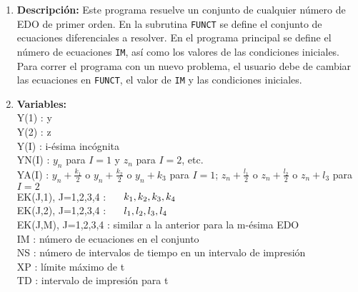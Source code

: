 \documentclass[11pt]{article}
\begin{document}
\begin{enumerate}
\item \textbf{Descripción:} Este programa resuelve un conjunto de cualquier número de EDO de primer orden. En la subrutina \texttt{FUNCT} se define el conjunto de ecuaciones diferenciales a resolver. En el programa principal se define el número de ecuaciones \texttt{IM}, así como los valores de las condiciones iniciales. Para correr el programa con un nuevo problema, el usuario debe de cambiar las ecuaciones en \texttt{FUNCT}, el valor de \texttt{IM} y las condiciones iniciales.
\item \textbf{Variables:}\\
Y(1) : y \\
Y(2) : z \\
Y(I) : i-ésima incógnita \\
YN(I) : $y_{n}$ para $I=1$ y $z_{n}$ para $I=2$, etc. \\
YA(I) : $y_{n}+\frac{k_{1}}{2}$ o $y_{n}+\frac{k_{2}}{2}$ o $y_{n}+k_{3}$ para $I=1$; $z_{n}+\frac{l_{1}}{2}$ o $z_{n}+\frac{l_{2}}{2}$ o $z_{n}+l_{3}$ para $I=2$\\
EK(J,1), J=1,2,3,4 : $\hspace{0.5cm} k_{1},k_{2},k_{3},k_{4}$ \\
EK(J,2), J=1,2,3,4 : $\hspace{0.5cm} l_{1},l_{2},l_{3},l_{4}$ \\
EK(J,M), J=1,2,3,4 : similar a la anterior para la m-ésima EDO \\
IM : número de ecuaciones en el conjunto \\
NS : número de intervalos de tiempo en un intervalo de impresión \\
XP : límite máximo de t \\
TD : intervalo de impresión para t
\end{enumerate}
\end{document}
